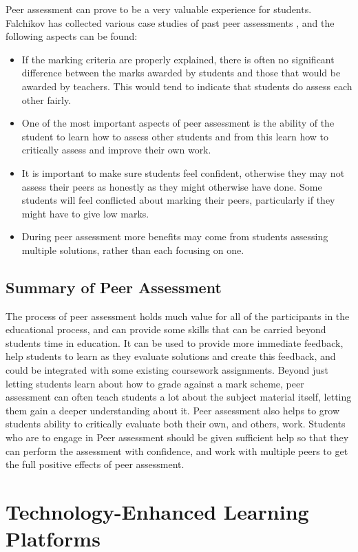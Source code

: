 \documentclass[a4paper,11pt]{report}
\begin{document}
Peer assessment can prove to be a very valuable experience for students. Falchikov has collected various case studies of past peer assessments \cite{falchikov_improving_2013}, and the following aspects can be found:
\begin{itemize}
 \item If the marking criteria are properly explained, there is often no significant difference between the marks awarded by students and those that would be awarded by teachers. This would tend to indicate that students do assess each other fairly.
 \item One of the most important aspects of peer assessment is the ability of the student to learn how to assess other students and from this learn how to critically assess and improve their own work.
 \item It is important to make sure students feel confident, otherwise they may not assess their peers as honestly as they might otherwise have done. Some students will feel conflicted about marking their peers, particularly if they might have to give low marks.
 \item During peer assessment more benefits may come from students assessing multiple solutions, rather than each focusing on one.
\end{itemize}

\subsection{Summary of Peer Assessment}
The process of peer assessment holds much value for all of the participants in the educational process, and can provide some skills that can be carried beyond students time in education. It can be used to provide more immediate feedback, help students to learn as they evaluate solutions and create this feedback, and could be integrated with some existing coursework assignments. Beyond just letting students learn about how to grade against a mark scheme, peer assessment can often teach students a lot about the subject material itself, letting them gain a deeper understanding about it. Peer assessment also helps to grow students ability to critically evaluate both their own, and others, work. Students who are to engage in Peer assessment should be given sufficient help so that they can perform the assessment with confidence, and work with multiple peers to get the full positive effects of peer assessment.


\section{Technology-Enhanced Learning Platforms}
\end{document}
